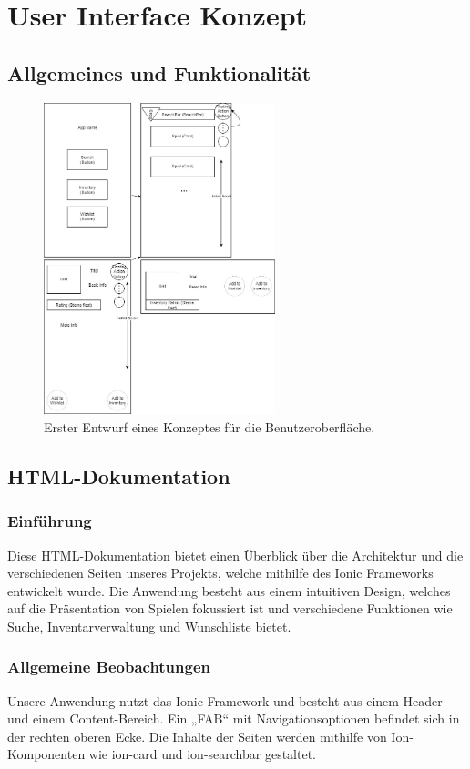 \chapter{User Interface Konzept}
\section{Allgemeines und Funktionalität}
\begin{figure}[H]
    \centering
    \includegraphics[width=0.6\textwidth]{graphics/konzept.jpeg}
    \caption{Erster Entwurf eines Konzeptes für die Benutzeroberfläche.}
    \label{fig:konzept}
\end{figure}

\section{HTML-Dokumentation}
\subsection{Einführung}
Diese HTML-Dokumentation bietet einen Überblick über die Architektur und die verschiedenen Seiten unseres Projekts,
welche mithilfe des Ionic Frameworks entwickelt wurde. Die Anwendung besteht aus einem intuitiven Design, welches auf die Präsentation von Spielen fokussiert
ist und verschiedene Funktionen wie Suche, Inventarverwaltung und Wunschliste bietet.
\subsection{Allgemeine Beobachtungen}
Unsere Anwendung nutzt das Ionic Framework und besteht aus einem Header- und einem Content-Bereich.
Ein „\ac{FAB}“ mit Navigationsoptionen befindet sich in der rechten oberen Ecke. Die Inhalte der Seiten werden mithilfe von Ion-Komponenten wie ion-card und ion-searchbar gestaltet.
